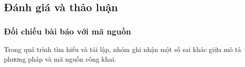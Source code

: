 \subsection{Đánh giá và thảo luận}

\subsubsection{Đối chiếu bài báo với mã nguồn}
\label{sec:cateea_code_comparison}

Trong quá trình tìm hiểu và tái lập, nhóm ghi nhận một số sai khác giữa mô tả phương pháp và mã nguồn công khai. 





